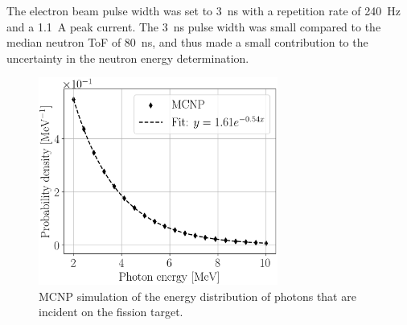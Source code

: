 The electron beam pulse width was set to 3~ns with a repetition rate of 240~Hz and a 1.1~A peak current.
The 3~ns pulse width was small compared to the median neutron ToF of 80~ns, and thus made a small contribution to the uncertainty in the neutron energy determination.

\begin{figure}[h]
\centering
\includegraphics[width=0.7\textwidth]{Content/Methods/MCNPBremDistribution.png}
\caption{MCNP simulation of the energy distribution of photons that are incident on the fission target.}
\label{fig:BremDist}
\end{figure}

